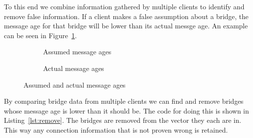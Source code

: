 To this end we combine information gathered by multiple clients to identify and remove false information.
If a client makes a false assumption about a bridge, the message age for that bridge will be lower than its actual messge age.
An example can be seen in Figure~\ref{fig:message_ages}.
\begin{figure}[h]
    \begin{subfigure}[b]{0.4\textwidth}
        \caption{Assumed message ages}
    \end{subfigure}
    \hspace{1cm}
    \begin{subfigure}[b]{0.4\textwidth}
        \caption{Actual message ages}
    \end{subfigure}

    \caption{Assumed and actual message ages}
    \label{fig:message_ages}
\end{figure}
By comparing bridge data from multiple clients we can find and remove bridges whose message age is lower than it should be.
The code for doing this is shown in Listing~\ref{lst:remove}.
The bridges are removed from the vector they each are in.
This way any connection information that is not proven wrong is retained.
